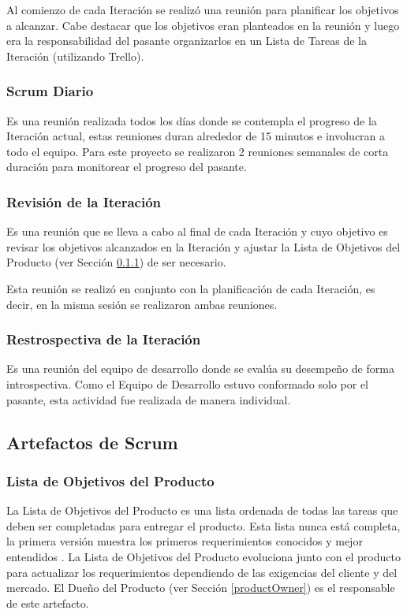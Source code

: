 Al comienzo de cada Iteración se realizó una reunión para planificar los objetivos a alcanzar. Cabe destacar que los objetivos eran planteados en la reunión y luego era la responsabilidad del pasante organizarlos en un Lista de Tareas de la Iteración (utilizando Trello).

\subsubsection{Scrum Diario}
Es una reunión realizada todos los días donde se contempla el progreso de la Iteración actual, estas reuniones duran alrededor de 15 minutos e involucran a todo el equipo. Para este proyecto se realizaron 2 reuniones semanales de corta duración para monitorear el progreso del pasante.

\subsubsection{Revisión de la Iteración}
Es una reunión que se lleva a cabo al final de cada Iteración y cuyo objetivo es revisar los objetivos alcanzados en la Iteración y ajustar la Lista de Objetivos del Producto (ver Sección \ref{productBacklog}) de ser necesario.

Esta reunión se realizó en conjunto con la planificación de cada Iteración, es decir, en la misma sesión se realizaron ambas reuniones.

\subsubsection{Restrospectiva de la Iteración}
Es una reunión del equipo de desarrollo donde se evalúa su desempeño de forma introspectiva. Como el Equipo de Desarrollo estuvo conformado solo por el pasante, esta actividad fue realizada de manera individual.


\subsection{Artefactos de Scrum}
\subsubsection{Lista de Objetivos del Producto} \label{productBacklog}
La Lista de Objetivos del Producto es una lista ordenada de todas las tareas que deben ser completadas para entregar el producto. Esta lista nunca está completa, la primera versión muestra los primeros requerimientos conocidos y mejor entendidos \cite{scrumSchwaber}. La Lista de Objetivos del Producto evoluciona junto con el producto para actualizar los requerimientos dependiendo de las exigencias del cliente y del mercado. El Dueño del Producto (ver Sección \ref{productOwner}) es el responsable de este artefacto.

